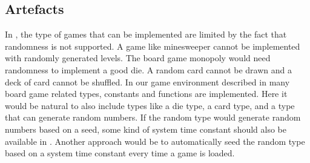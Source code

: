 \subsection{Artefacts}
\label{sec:artefacts}

In \productname{}, the type of games that can be implemented are limited by the fact that randomness is not supported. 
A game like minesweeper cannot be implemented with randomly generated levels. The board game monopoly would need randomness 
to implement a good die. A random card cannot be drawn and a deck of card cannot be shuffled. In our game environment described in  many board game related types, constants and functions are implemented. Here it would be natural to also include types like
a die type, a card type, and a type that can generate random numbers. If the random type would generate random numbers based on a seed, some kind of system time constant should also be available in \productname{}. Another approach would be to automatically seed the random type based on a system time constant every time a game is loaded. 